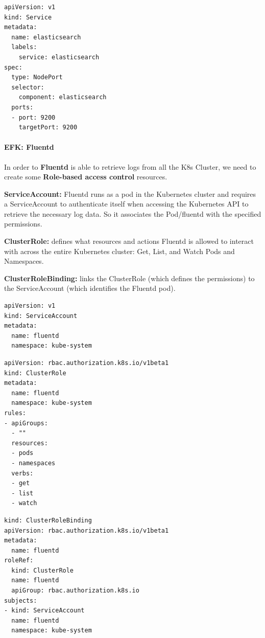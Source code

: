 \documentclass{article}
\newenvironment{codetemplate}[1][]{%
  \mybasecolorbox[#1]
  \itshape
}{%
  \endmybasecolorbox
}
\begin{document}
\begin{codetemplate}{}
\begin{verbatim}
apiVersion: v1
kind: Service
metadata:
  name: elasticsearch
  labels:
	service: elasticsearch
spec:
  type: NodePort
  selector:
	component: elasticsearch
  ports:
  - port: 9200
	targetPort: 9200
\end{verbatim}
\end{codetemplate}

\paragraph{EFK: Fluentd}

In order to \textbf{Fluentd} is able to retrieve logs from all the K8s Cluster, we need to create some \textbf{Role-based access control} resources.

\textbf{ServiceAccount:} Fluentd runs as a pod in the Kubernetes cluster and requires a ServiceAccount to authenticate itself when accessing the Kubernetes API to retrieve the necessary log data. So it associates the Pod/fluentd with the specified permissions.

\textbf{ClusterRole:} defines what resources and actions Fluentd is allowed to interact with across the entire Kubernetes cluster: Get, List, and Watch Pods and Namespaces.

\textbf{ClusterRoleBinding:} links the ClusterRole (which defines the permissions) to the ServiceAccount (which identifies the Fluentd pod).

\begin{codetemplate}{}
\begin{verbatim}
apiVersion: v1
kind: ServiceAccount
metadata:
  name: fluentd
  namespace: kube-system
\end{verbatim}
\end{codetemplate}
\begin{codetemplate}{}
\begin{verbatim}
apiVersion: rbac.authorization.k8s.io/v1beta1
kind: ClusterRole
metadata:
  name: fluentd
  namespace: kube-system
rules:
- apiGroups:
  - ""
  resources:
  - pods
  - namespaces
  verbs:
  - get
  - list
  - watch
\end{verbatim}
\end{codetemplate}
\begin{codetemplate}{}
\begin{verbatim}
kind: ClusterRoleBinding
apiVersion: rbac.authorization.k8s.io/v1beta1
metadata:
  name: fluentd
roleRef:
  kind: ClusterRole
  name: fluentd
  apiGroup: rbac.authorization.k8s.io
subjects:
- kind: ServiceAccount
  name: fluentd
  namespace: kube-system
\end{verbatim}
\end{codetemplate}
\end{document}
